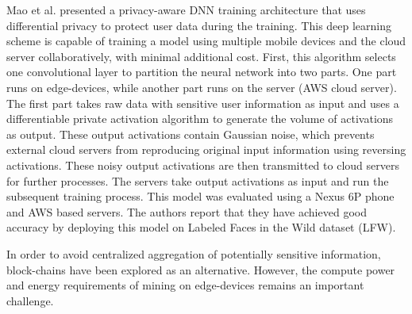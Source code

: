 \documentclass[letterpaper, 10 pt, conference]{ieeeconf}
\begin{document}
Mao et al. presented a privacy-aware DNN training architecture that uses differential privacy to protect user data during the training\cite{Mao_Yi_Li_Feng_Xu_Zhong_2018}. This deep learning scheme is capable of training a model using multiple mobile devices and the cloud server collaboratively, with minimal additional cost. First, this algorithm selects one convolutional layer to partition the neural network into two parts. One part runs on edge-devices, while another part runs on the server (AWS cloud server). The first part takes raw data with sensitive user information as input and uses a differentiable private activation algorithm to generate the volume of activations as output. These output activations contain Gaussian noise, which prevents external cloud servers from reproducing original input information using reversing activations. These noisy output activations are then transmitted to cloud servers for further processes. The servers take output activations as input and run the subsequent training process. This model was evaluated using a Nexus 6P phone and AWS based servers. The authors report that they have achieved good accuracy by deploying this model on Labeled Faces in the Wild dataset (LFW).

In order to avoid centralized aggregation of potentially sensitive information, block-chains have been explored as an alternative\cite{Kim_Moon_2018}. However, the compute power and energy requirements of mining on edge-devices remains an important challenge\cite{Wang_Han_Leung_Niyato_Yan_Chen_2020}.
\end{document}
